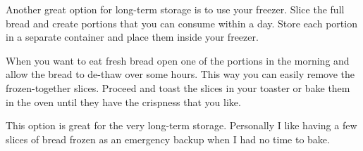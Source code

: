 Another great option for long-term storage is to use
your freezer. Slice the full bread and create portions
that you can consume within a day. Store each portion
in a separate container and place them inside your
freezer.

When you want to eat fresh bread open one of the portions
in the morning and allow the bread to de-thaw over some
hours. This way you can easily remove the frozen-together
slices. Proceed and toast the slices in your toaster
or bake them in the oven until they have the crispness
that you like.

This option is great for the very long-term storage. Personally
I like having a few slices of bread frozen as an emergency
backup when I had no time to bake.